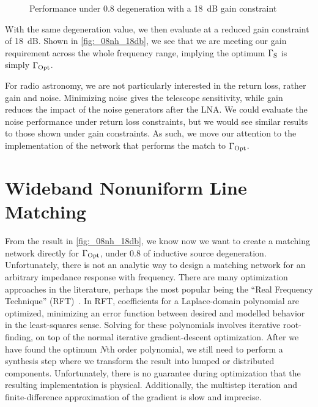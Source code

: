 \begin{figure}[ht!]
    \centering
     
    \caption{Performance under \qty{0.8}{\nH} degeneration with a \qty{18}{\dB} gain constraint}
    \label{fig:_08nh_18db}
\end{figure}

With the same degeneration value, we then evaluate at a reduced gain constraint of \qty{18}{\dB}.
Shown in \autoref{fig:_08nh_18db}, we see that we are meeting our gain requirement across the whole frequency range, implying the optimum $\Gamma_{\text{S}}$ is simply $\Gamma_{\text{Opt}}$.

For radio astronomy, we are not particularly interested in the return loss, rather gain and noise.
Minimizing noise gives the telescope sensitivity, while gain reduces the impact of the noise generators after the LNA.
We could evaluate the noise performance under return loss constraints, but we would see similar results to those shown under gain constraints.
As such, we move our attention to the implementation of the network that performs the match to $\Gamma_{\text{Opt}}$.

\section{Wideband Nonuniform Line Matching}

From the result in \autoref{fig:_08nh_18db}, we know now we want to create a matching network directly for $\Gamma_{\text{Opt}}$, under \qty{0.8}{\nH} of inductive source degeneration.
Unfortunately, there is not an analytic way to design a matching network for an arbitrary impedance response with frequency.
There are many optimization approaches in the literature, perhaps the most popular being the ``Real Frequency Technique'' (RFT)~\cite{yarmanSimplifiedRealFrequency1982,carlinOptimumBroadbandMatching1981}.
In RFT, coefficients for a Laplace-domain polynomial are optimized, minimizing an error function between desired and modelled behavior in the least-squares sense.
Solving for these polynomials involves iterative root-finding, on top of the normal iterative gradient-descent optimization.
After we have found the optimum $N$th order polynomial, we still need to perform a synthesis step where we transform the result into lumped or distributed components.
Unfortunately, there is no guarantee during optimization that the resulting implementation is physical.
Additionally, the multistep iteration and finite-difference approximation of the gradient is slow and imprecise.

